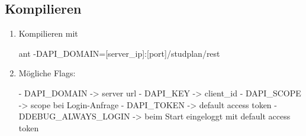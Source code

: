 \subsection{Kompilieren}
\begin{enumerate}
	\item Kompilieren mit 
	\begin{json}
	ant -DAPI_DOMAIN=[server_ip]:[port]/studplan/rest 
	\end{json}
	\item Mögliche Flags:
	\begin{json}
	- DAPI_DOMAIN -> server url
	- DAPI_KEY -> client_id
	- DAPI_SCOPE -> scope bei Login-Anfrage
	- DAPI_TOKEN -> default access token
	- DDEBUG_ALWAYS_LOGIN -> beim Start eingeloggt mit default access token
	\end{json}
\end{enumerate}

